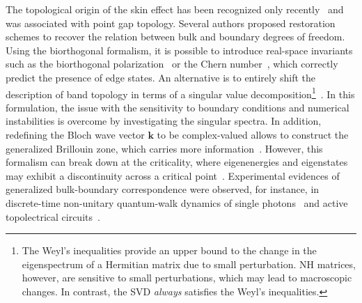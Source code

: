 The topological origin of the skin effect has been recognized only recently~\cite{okuma2019topological, zhang2019correspondence} and was associated with point gap topology. Several authors proposed restoration schemes to recover the relation between bulk and boundary degrees of freedom. Using the biorthogonal formalism, it is possible to introduce real-space invariants such as the biorthogonal polarization~\cite{bbbc} or the Chern number~\cite{PhysRevLett.123.246801}, which correctly predict the presence of edge states. An alternative is to entirely shift the description of band topology in terms of a singular value decomposition\footnote{The Weyl's inequalities provide an upper bound to the change in the eigenspectrum of a Hermitian matrix due to small perturbation. NH matrices, however, are sensitive to small perturbations, which may lead to macroscopic changes. In contrast, the SVD \emph{always} satisfies the Weyl's inequalities.}~\cite{SVDHerviou2019}. In this formulation, the issue with the sensitivity to boundary conditions and numerical instabilities is overcome by investigating the singular spectra. In addition, redefining the Bloch wave vector $\mathbf{k}$ to be complex-valued allows to construct the generalized Brillouin zone, which carries more information~\cite{Shunyu2018prl, PhysRevLett.121.136802, PhysRevLett.123.066404}. However, this formalism can break down at the criticality, where eigenenergies and eigenstates may exhibit a discontinuity across a critical point~\cite{li2020critical}. Experimental evidences of generalized bulk-boundary correspondence were observed, for instance, in discrete-time non-unitary quantum-walk dynamics of single photons~\cite{qwalks1} and active topolectrical circuits~\cite{Helbig2020}.

